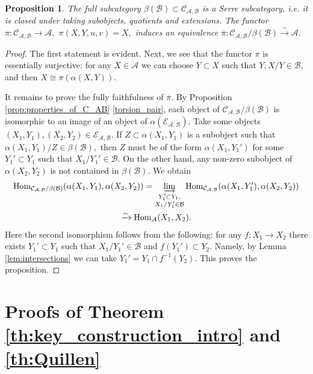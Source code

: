 \documentclass[11pt,leqno]{amsart}
\newtheorem{prop}[theo]{Proposition}
\numberwithin{equation}{section}
\def\Hom{\operatorname{Hom}}
\newcommand{\indlim}[1][]{\mathop{\varinjlim}\limits_{#1}}
\newcommand{\bbar}{\overline}
\newcommand{\xto}{\xrightarrow}
\newcommand{\cA}{{\mathcal A}}
\newcommand{\cB}{{\mathcal B}}
\newcommand{\cC}{{\mathcal C}}
\newcommand{\cE}{{\mathcal E}}
\begin{document}
\begin{prop}\label{prop:Serre_quotient}
The full subcategory $\beta(\cB)\subset \cC_{\cA,\cB}$ is a Serre subcategory, i.e. it is closed under taking subobjects, quotients and extensions. The functor $\pi:\cC_{\cA,\cB}\to \cA,$ $\pi(X,Y,u,v)=X,$ induces an equivalence $\bbar{\pi}:\cC_{\cA,\cB}/\beta(\cB)\xto{\sim} \cA.$
\end{prop}

\begin{proof}
The first statement is evident. Next, we see that the functor $\pi$ is essentially surjective: for any $X\in\cA$ we can choose $Y\subset X$ such that $Y,X/Y\in\cB,$ and then $X\cong \pi(\alpha(X,Y)).$

It remains to prove the fully faithfulness of $\bbar{\pi}.$ By Proposition \ref{prop:properties_of_C_AB} \ref{torsion_pair}, each object of $\cC_{\cA,\cB}/\beta(\cB)$ is isomorphic to an image of an object of $\alpha(\cE_{\cA,\cB}).$ Take some objects $(X_1,Y_1),(X_2,Y_2)\in\cE_{\cA,\cB}.$ If $Z\subset\alpha(X_1,Y_1)$ is a subobject such that $\alpha(X_1,Y_1)/Z\in\beta(\cB),$ then $Z$ must be of the form $\alpha(X_1,Y_1')$ for some $Y_1'\subset Y_1$ such that $X_1/Y_1'\in\cB.$ On the other hand, any non-zero subobject of $\alpha(X_2,Y_2)$ is not contained in $\beta(\cB).$ We obtain
\begin{multline*}
\Hom_{\cC_{\cA,\cB}/\beta(\cB)}(\alpha(X_1,Y_1),\alpha(X_2,Y_2))=\indlim[\substack{Y_1'\subset Y_1,\\ X_1/Y_1'\in\cB}]\Hom_{\cC_{\cA,\cB}}(\alpha(X_1,Y_1'),\alpha(X_2,Y_2))\\
\xto{\sim} \Hom_{\cA}(X_1,X_2).
\end{multline*}
Here the second isomorphism follows from the following: for any $f:X_1\to X_2$ there exists $Y_1'\subset Y_1$ such that $X_1/Y_1'\in\cB$ and $f(Y_1')\subset Y_2.$ Namely, by Lemma \ref{lem:intersections} we can take $Y_1' = Y_1\cap f^{-1}(Y_2).$ This proves the proposition. 
\end{proof}

\section{Proofs of Theorem \ref{th:key_construction_intro} and \ref{th:Quillen}}
\end{document}
